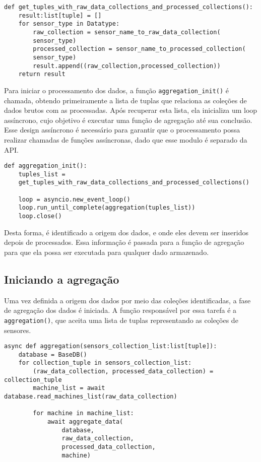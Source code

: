 \begin{verbatim}
def get_tuples_with_raw_data_collections_and_processed_collections():
    result:list[tuple] = []
    for sensor_type in Datatype:
        raw_collection = sensor_name_to_raw_data_collection(
        sensor_type)
        processed_collection = sensor_name_to_processed_collection(
        sensor_type)
        result.append((raw_collection,processed_collection))
    return result
\end{verbatim}

Para iniciar o processamento dos dados, a função \texttt{aggregation\_init()} é chamada, obtendo primeiramente a lista de tuplas que relaciona as coleções de dados brutos com as processadas. Após recuperar esta lista, ela inicializa um loop assíncrono, cujo objetivo é executar uma função de agregação até sua conclusão. Esse design assíncrono é necessário para garantir que o processamento possa realizar chamadas de funções assíncronas, dado que esse modulo é separado da API.

\begin{verbatim}
def aggregation_init():
    tuples_list = 
    get_tuples_with_raw_data_collections_and_processed_collections()

    loop = asyncio.new_event_loop()
    loop.run_until_complete(aggregation(tuples_list))
    loop.close()
\end{verbatim}

Desta forma, é identificado a origem dos dados, e onde eles devem ser inseridos depois de processados. Essa informação é passada para a função de agregação para que ela possa ser executada para qualquer dado armazenado.

\subsection{Iniciando a agregação}
Uma vez definida a origem dos dados por meio das coleções identificadas, a fase de agregação dos dados é iniciada. A função responsável por essa tarefa é a \texttt{aggregation()}, que aceita uma lista de tuplas representando as coleções de sensores.

\begin{verbatim}
async def aggregation(sensors_collection_list:list[tuple]):
    database = BaseDB()
    for collection_tuple in sensors_collection_list:
        (raw_data_collection, processed_data_collection) = collection_tuple
        machine_list = await database.read_machines_list(raw_data_collection)

        for machine in machine_list:
            await aggregate_data(
                database,
                raw_data_collection,
                processed_data_collection,
                machine)
\end{verbatim}

